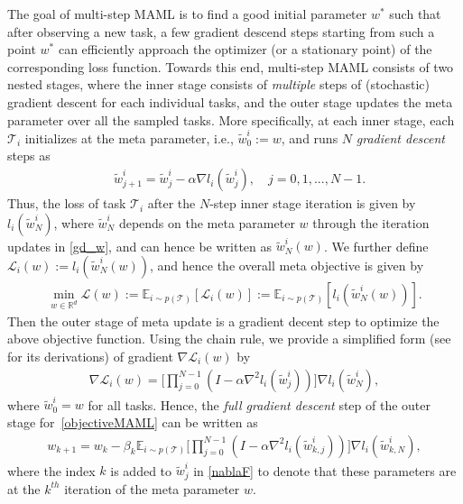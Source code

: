 \documentclass{osudissert96}
\begin{document}
The goal of multi-step MAML is to find a good initial parameter $w^*$ such that after observing a new task, a few gradient descend steps starting from such a point $w^*$ can efficiently approach the optimizer (or a stationary point) of the corresponding loss function. Towards this end, multi-step MAML consists of two nested stages, where the inner stage consists of  {\em multiple} steps of (stochastic) gradient descent for each individual tasks, and the outer stage updates the meta parameter over all the sampled tasks. More specifically, at each inner stage, each $\mathcal{T}_i$ initializes at the meta parameter, i.e., $\widetilde w^i_0 := w$, and runs $N$ {\em gradient descent} steps as 
\begin{align}\label{gd_w}
&\widetilde w^i_{j+1} = \widetilde w^i_j - \alpha \nabla l_i( \widetilde w^i_j), \quad j = 0,1,..., N-1 .
\end{align}
Thus, the loss of task $\mathcal{T}_i$ after the $N$-step inner stage iteration is given by $l_i(\widetilde w^i_N)$, where $\widetilde w^i_N$ depends on the meta parameter $w$ through the iteration updates in \cref{gd_w}, and can hence be written as $\widetilde w^i_N(w)$.  We further define $\mathcal{L}_i(w):=l_i(\widetilde w^i_N(w))$, and hence the overall meta objective is given by
\begin{align}\label{objectiveMAML}
\min_{w\in\mathbb{R}^d} \mathcal{L}(w):= \mathbb{E}_{i\sim p(\mathcal{T})}[ \mathcal{L}_i(w)]  :=  \mathbb{E}_{i\sim p(\mathcal{T})} [l_i(\widetilde w^i_N(w))].
\end{align}
Then the outer stage of meta update is a gradient decent step to optimize the above objective function. Using the chain rule, we provide a simplified form (see~ for its derivations) of  gradient $\nabla \mathcal{L}_i(w)$ by   
	\begin{align}\label{nablaF}
	\nabla \mathcal{L}_i(w) = \bigg[ \prod_{j=0}^{N-1}(I-\alpha \nabla^2 l_i(\widetilde w^i_{j}))\bigg]\nabla l_i(\widetilde w^i _{N}),
	\end{align}
	where $\widetilde w^i_{0} = w$ for all tasks. 
	Hence, the {\em full gradient descent} step of the outer stage for~\cref{objectiveMAML} can be written as  
\begin{align}\label{true_meta_gd}
w_{k+1}  = w_k - \beta_k \mathbb{E}_{i\sim p(\mathcal{T})}\bigg[\prod_{j=0}^{N-1}(I-\alpha \nabla^2 l_i(\widetilde w^i_{k,j}))\bigg]\nabla l_i(\widetilde w^i _{k,N}),
\end{align}
where the index $k$ is added to $\widetilde w^i_{j}$ in \cref{nablaF} to denote that these parameters are at the $k^{th}$ iteration of the meta parameter $w$.
\end{document}
